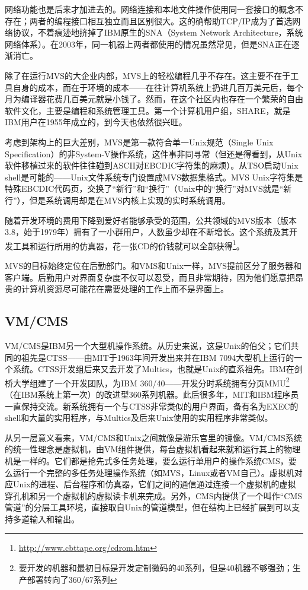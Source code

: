\documentclass[12pt,oneside]{book}
\begin{document}
网络功能也是后来才加进去的。网络连接和本地文件操作使用同一套接口的概念不存在；两者的编程接口相互独立而且区别很大。这的确帮助TCP/IP成为了首选网络协议，不着痕迹地挤掉了IBM原生的SNA（System Network Architecture，系统网络体系）。在2003年，同一机器上两者都使用的情况虽然常见，但是SNA正在逐渐消亡。

除了在运行MVS的大企业内部，MVS上的轻松编程几乎不存在。这主要不在于工具自身的成本，而在于环境的成本——在往计算机系统上扔进几百万美元后，每个月为编译器花费几百美元就是小钱了。然而，在这个社区内也存在一个繁荣的自由软件文化，主要是编程和系统管理工具。第一个计算机用户组，SHARE，就是IBM用户在1955年成立的，到今天也依然很兴旺。

考虑到架构上的巨大差别，MVS是第一款符合单一Unix规范（Single Unix Specification）的非System-V操作系统，这件事非同寻常（但还是得看到，从Unix软件移植过来的软件往往碰到ASCII对EBCDIC字符集的麻烦）。从TSO启动Unix shell是可能的——Unix文件系统专门设置成MVS数据集格式。MVS Unix字符集是特殊EBCDIC代码页，交换了“新行”和“换行”（Unix中的“换行”对MVS就是“新行”），但是系统调用却是在MVS内核上实现的实时系统调用。

随着开发环境的费用下降到爱好者能够承受的范围，公共领域的MVS版本（版本3.8，始于1979年）拥有了一小群用户，人数虽少却在不断增长。这个系统及其开发工具和运行所用的仿真器，花一张CD的价钱就可以全部获得\footnote{\href{http://www.cbttape.org/cdrom.htm}{http://www.cbttape.org/cdrom.htm}}。

MVS的目标始终定位在后勤部门。和VMS和Unix一样，MVS提前区分了服务器和客户端。后勤用户对界面复杂度不仅可以忍受，而且非常期待，因为他们愿意把昂贵的计算机资源尽可能花在需要处理的工作上而不是界面上。

\subsection{VM/CMS}
VM/CMS是IBM另一个大型机操作系统。从历史来说，这是Unix的伯父；它们共同的祖先是CTSS——由MIT于1963年间开发出来并在IBM 7094大型机上运行的一个系统。CTSS开发组后来又去开发了Multics，也就是Unix的直系祖先。IBM在剑桥大学组建了一个开发团队，为IBM 360/40——开发分时系统拥有分页MMU\footnote{要开发的机器和最初目标是开发定制微码的40系列，但是40机器不够强劲；生产部署转向了360/67系列}（在IBM系统上第一次）的改进型360系列机器。此后很多年，MIT和IBM程序员一直保持交流。新系统拥有一个与CTSS非常类似的用户界面，备有名为EXEC的shell和大量的实用程序，与Multics及后来Unix使用的实用程序非常类似。

从另一层意义看来，VM/CMS和Unix之间就像是游乐宫里的镜像。VM/CMS系统的统一性理念是虚拟机，由VM组件提供，每台虚拟机看起来就和运行其上的物理机是一样的。它们都是抢先式多任务处理，要么运行单用户的操作系统CMS，要么运行一个完整的多任务处理操作系统（如MVS，Linux或者VM自己）。虚拟机对应Unix的进程、后台程序和仿真器，它们之间的通信通过连接一个虚拟机的虚拟穿孔机和另一个虚拟机的虚拟读卡机来完成。另外，CMS内提供了一个叫作“CMS管道”的分层工具环境，直接取自Unix的管道模型，但在结构上已经扩展到可以支持多道输入和输出。
\end{document}
